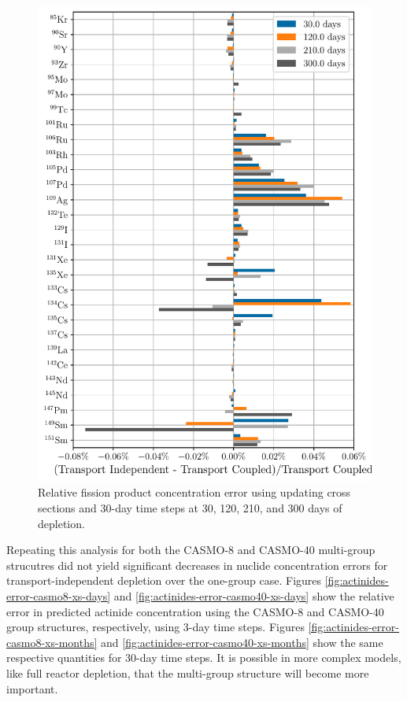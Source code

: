    \begin{figure}[htpb]
        \centering
        \includegraphics[width=\linewidth]{figs/fission_products_updating_xs_predictor_fission_q_months.pdf}
        \caption{Relative fission product concentration error using
        updating cross sections and 30-day time steps at 30, 120, 210, and 300
    days of depletion.}
        \label{fig:fp-error-updating-xs-months}
    \end{figure}

    Repeating this analysis for both the CASMO-8 and CASMO-40 multi-group
    strucutres did not yield significant decreases in nuclide concentration
    errors for transport-independent depletion over the one-group case.  Figures
    \ref{fig:actinides-error-casmo8-xs-days} and
    \ref{fig:actinides-error-casmo40-xs-days} show the relative error in
    predicted actinide concentration using the CASMO-8 and CASMO-40 group
    structures, respectively, using 3-day time steps. Figures
    \ref{fig:actinides-error-casmo8-xs-months} and
    \ref{fig:actinides-error-casmo40-xs-months} show the same respective
    quantities for 30-day time steps.  It is possible in more complex models,
    like full reactor depletion, that the multi-group structure will become more
    important. 

